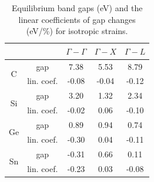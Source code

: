 \begin{table}[!htbp]
    \centering
    \caption{Equilibrium band gaps (eV) and the linear coefficients of gap changes (eV/\%) for isotropic strains.}
    \begin{tabular}{|c|c|c|c|c|}
        \hline
        \multicolumn{2}{|c|}{}      & $\Gamma-\Gamma$ & $\Gamma-X$ & $\Gamma-L$ \\ \hline
        \multirow{2}{*}{C}  & gap    & 7.38            & 5.53       & 8.79       \\ \cline{2-5} 
                            & lin. coef.  & -0.08           & -0.04      & -0.12      \\ \hline
        \multirow{2}{*}{Si} & gap    & 3.20            & 1.32       & 2.34       \\ \cline{2-5} 
                            & lin. coef.  & -0.02           & 0.06       & -0.10      \\ \hline
        \multirow{2}{*}{Ge} & gap    & 0.89            & 0.94       & 0.74       \\ \cline{2-5} 
                            & lin. coef.  & -0.30           & 0.04       & -0.11      \\ \hline
        \multirow{2}{*}{Sn} & gap    & -0.31           & 0.66       & 0.11       \\ \cline{2-5} 
                            & lin. coef.  & -0.23           & 0.03       & -0.08      \\ \hline
    \end{tabular}
    \label{Tab:strain_gap_iso}
\end{table}

